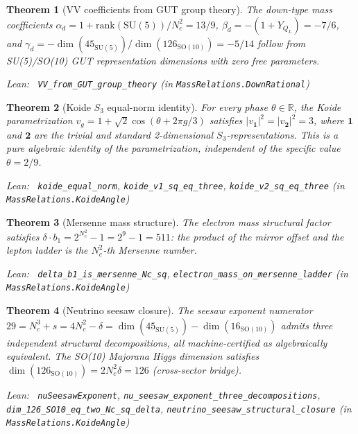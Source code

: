 \documentclass[11pt,a4paper]{article}
\newenvironment{leanref}%
  {\par\smallskip\noindent\begingroup\raggedright\textup{Lean:}~}%
  {\par\endgroup}
\newtheorem{theorem}{Theorem}[section]
\theoremstyle{definition}
\begin{document}
\begin{theorem}[VV coefficients from GUT group theory]\label{thm:vv-gut}
The down-type mass coefficients $\alpha_d = 1 + \mathrm{rank}(\mathrm{SU}(5))/N_c^2 = 13/9$,
$\beta_d = -(1+Y_{Q_L}) = -7/6$, and
$\gamma_d = -\dim(45_{\mathrm{SU}(5)})/\dim(126_{\mathrm{SO}(10)}) = -5/14$
follow from SU(5)/SO(10) GUT representation dimensions with zero free parameters.

\begin{leanref} \lstinline|VV_from_GUT_group_theory|
\textup{(in \texttt{MassRelations.DownRational})}
\end{leanref}
\end{theorem}

\begin{theorem}[Koide $S_3$ equal-norm identity]\label{thm:koide-equal-norm}
For every phase $\theta \in \mathbb{R}$, the Koide parametrization
$v_g = 1 + \sqrt{2}\cos(\theta + 2\pi g/3)$ satisfies
$|v_{\mathbf{1}}|^2 = |v_{\mathbf{2}}|^2 = 3$,
where $\mathbf{1}$ and $\mathbf{2}$ are the trivial and standard 2-dimensional
$S_3$-representations.  This is a pure algebraic identity of the parametrization,
independent of the specific value $\theta = 2/9$.

\begin{leanref} \lstinline|koide_equal_norm|,
\lstinline|koide_v1_sq_eq_three|, \lstinline|koide_v2_sq_eq_three|
\textup{(in \texttt{MassRelations.KoideAngle})}
\end{leanref}
\end{theorem}

\begin{theorem}[Mersenne mass structure]\label{thm:mersenne-mass}
The electron mass structural factor satisfies
$\delta \cdot b_1 = 2^{N_c^2} - 1 = 2^9 - 1 = 511$:
the product of the mirror offset and the lepton ladder is the $N_c^2$-th Mersenne number.

\begin{leanref} \lstinline|delta_b1_is_mersenne_Nc_sq|,
\lstinline|electron_mass_on_mersenne_ladder|
\textup{(in \texttt{MassRelations.KoideAngle})}
\end{leanref}
\end{theorem}

\begin{theorem}[Neutrino seesaw closure]\label{thm:seesaw-closure}
The seesaw exponent numerator $29 = N_c^3 + s = 4N_c^2 - \delta =
\dim(45_{\mathrm{SU}(5)}) - \dim(16_{\mathrm{SO}(10)})$
admits three independent structural decompositions,
all machine-certified as algebraically equivalent.
The SO(10) Majorana Higgs dimension satisfies
$\dim(126_{\mathrm{SO}(10)}) = 2N_c^2\delta = 126$ (cross-sector bridge).

\begin{leanref} \lstinline|nuSeesawExponent|,
\lstinline|nu_seesaw_exponent_three_decompositions|,
\lstinline|dim_126_SO10_eq_two_Nc_sq_delta|,
\lstinline|neutrino_seesaw_structural_closure|
\textup{(in \texttt{MassRelations.KoideAngle})}
\end{leanref}
\end{theorem}
\end{document}
